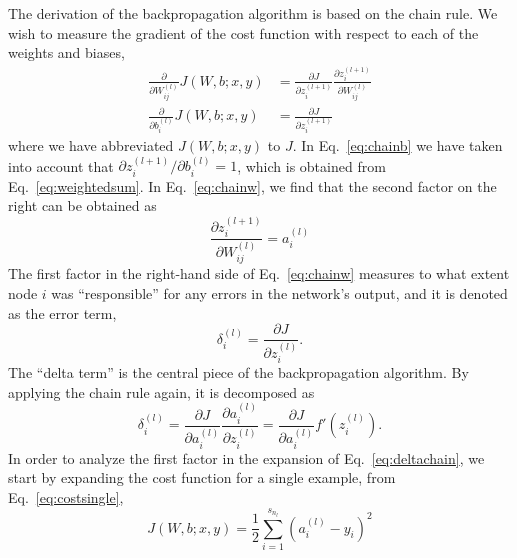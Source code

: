 \documentclass{article}
\begin{document}
The derivation of the backpropagation algorithm is based on the chain rule. We wish to measure the gradient of the cost function with respect to each of the weights and biases,
\begin{align}
\frac{\partial}{\partial W_{ij}^{(l)}} J(W,b; x, y) & = \frac{\partial J}{\partial z_i^{(l+1)}} \frac{\partial z_i^{(l+1)}}{\partial W_{ij}^{(l)}} \label{eq:chainw}\\
\frac{\partial}{\partial b_i^{(l)}} J(W,b; x, y) & = \frac{\partial J}{\partial z_i^{(l+1)}} \label{eq:chainb}
\end{align}
where we have abbreviated $J(W,b; x, y)$ to $J$. In Eq.~\eqref{eq:chainb} we have taken into account that $\partial z_i^{(l+1)} / \partial b_i^{(l)} = 1$, which is obtained from Eq.~\eqref{eq:weightedsum}. In Eq.~\eqref{eq:chainw}, we find that the second factor on the right can be obtained as
\begin{equation}
\frac{\partial z_i^{(l+1)}}{\partial W_{ij}^{(l)}} = a_i^{(l)}
\end{equation}
The first factor in the right-hand side of Eq.~\eqref{eq:chainw} measures to what extent node $i$ was ``responsible'' for any errors in the network's output, and it is denoted as the error term,
\begin{equation}
\delta_i^{(l)} = \frac{\partial J}{\partial z_i^{(l)}}.
\end{equation}
The ``delta term'' is the central piece of the backpropagation algorithm. By applying the chain rule again, it is decomposed as
\begin{equation}
\delta_i^{(l)} = \frac{\partial J}{\partial a_i^{(l)}} \frac{\partial a_i^{(l)}}{\partial z_i^{(l)}} = \frac{\partial J}{\partial a_i^{(l)}} f'(z_i^{(l)}).
\label{eq:deltachain}
\end{equation}
In order to analyze the first factor in the expansion of Eq.~\eqref{eq:deltachain}, we start by expanding the cost function for a single example, from Eq.~\eqref{eq:costsingle},
\begin{equation}
J(W,b;x,y) = \frac{1}{2} \sum_{i=1}^{s_{n_l}} (a_i^{(l)}-y_i)^2
\end{equation}
\end{document}
